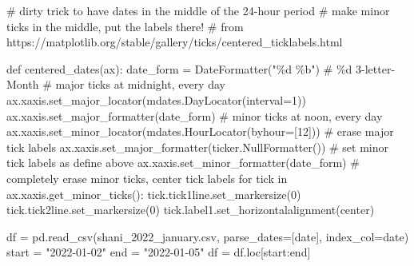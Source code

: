\documentclass[
  letterpaper,
  DIV=11,
  numbers=noendperiod,
  oneside]{scrreprt}
\newenvironment{Shaded}{\begin{snugshade}}{\end{snugshade}}
\newcommand{\CommentTok}[1]{\textcolor[rgb]{0.37,0.37,0.37}{#1}}
\newcommand{\ControlFlowTok}[1]{\textcolor[rgb]{0.00,0.23,0.31}{#1}}
\newcommand{\DecValTok}[1]{\textcolor[rgb]{0.68,0.00,0.00}{#1}}
\newcommand{\KeywordTok}[1]{\textcolor[rgb]{0.00,0.23,0.31}{#1}}
\newcommand{\NormalTok}[1]{\textcolor[rgb]{0.00,0.23,0.31}{#1}}
\newcommand{\OperatorTok}[1]{\textcolor[rgb]{0.37,0.37,0.37}{#1}}
\newcommand{\SpecialCharTok}[1]{\textcolor[rgb]{0.37,0.37,0.37}{#1}}
\newcommand{\StringTok}[1]{\textcolor[rgb]{0.13,0.47,0.30}{#1}}
\begin{document}
\begin{Shaded}
\begin{Highlighting}[]
\CommentTok{\# dirty trick to have dates in the middle of the 24{-}hour period}
\CommentTok{\# make minor ticks in the middle, put the labels there!}
\CommentTok{\# from https://matplotlib.org/stable/gallery/ticks/centered\_ticklabels.html}

\KeywordTok{def}\NormalTok{ centered\_dates(ax):}
\NormalTok{    date\_form }\OperatorTok{=}\NormalTok{ DateFormatter(}\StringTok{"}\SpecialCharTok{\%d}\StringTok{ \%b"}\NormalTok{)  }\CommentTok{\# \%d 3{-}letter{-}Month}
    \CommentTok{\# major ticks at midnight, every day}
\NormalTok{    ax.xaxis.set\_major\_locator(mdates.DayLocator(interval}\OperatorTok{=}\DecValTok{1}\NormalTok{))}
\NormalTok{    ax.xaxis.set\_major\_formatter(date\_form)}
    \CommentTok{\# minor ticks at noon, every day}
\NormalTok{    ax.xaxis.set\_minor\_locator(mdates.HourLocator(byhour}\OperatorTok{=}\NormalTok{[}\DecValTok{12}\NormalTok{]))}
    \CommentTok{\# erase major tick labels}
\NormalTok{    ax.xaxis.set\_major\_formatter(ticker.NullFormatter())}
    \CommentTok{\# set minor tick labels as define above}
\NormalTok{    ax.xaxis.set\_minor\_formatter(date\_form)}
    \CommentTok{\# completely erase minor ticks, center tick labels}
    \ControlFlowTok{for}\NormalTok{ tick }\KeywordTok{in}\NormalTok{ ax.xaxis.get\_minor\_ticks():}
\NormalTok{        tick.tick1line.set\_markersize(}\DecValTok{0}\NormalTok{)}
\NormalTok{        tick.tick2line.set\_markersize(}\DecValTok{0}\NormalTok{)}
\NormalTok{        tick.label1.set\_horizontalalignment(}\StringTok{\textquotesingle{}center\textquotesingle{}}\NormalTok{)}
\end{Highlighting}
\end{Shaded}

\begin{Shaded}
\begin{Highlighting}[]
\NormalTok{df }\OperatorTok{=}\NormalTok{ pd.read\_csv(}\StringTok{\textquotesingle{}shani\_2022\_january.csv\textquotesingle{}}\NormalTok{, parse\_dates}\OperatorTok{=}\NormalTok{[}\StringTok{\textquotesingle{}date\textquotesingle{}}\NormalTok{], index\_col}\OperatorTok{=}\StringTok{\textquotesingle{}date\textquotesingle{}}\NormalTok{)}
\NormalTok{start }\OperatorTok{=} \StringTok{"2022{-}01{-}02"}
\NormalTok{end }\OperatorTok{=} \StringTok{"2022{-}01{-}05"}
\NormalTok{df }\OperatorTok{=}\NormalTok{ df.loc[start:end]}
\end{Highlighting}
\end{Shaded}
\end{document}
